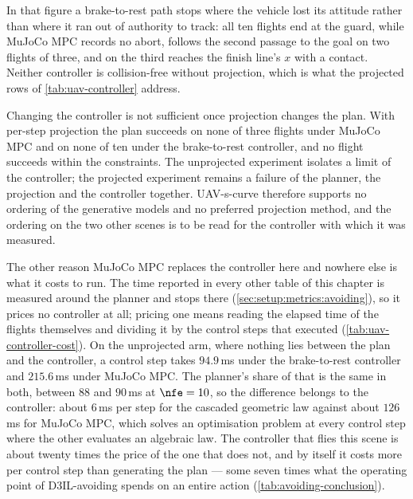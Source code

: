 In that figure a brake-to-rest path stops where the vehicle lost its attitude rather than where it ran
out of authority to track: all ten flights end at the guard, while MuJoCo MPC records no abort,
follows the second passage to the goal on two flights of three, and on the third reaches the finish
line's $x$ with a contact. Neither controller is collision-free
without projection, which is what the projected rows of \autoref{tab:uav-controller} address.

Changing the controller is not sufficient once projection changes the plan. With per-step projection the
plan succeeds on none of three flights under MuJoCo MPC and on none of ten under the brake-to-rest
controller, and no flight succeeds within the constraints. The unprojected experiment isolates a limit of
the controller; the projected experiment remains a failure of the planner, the projection and the
controller together. UAV-s-curve therefore supports no ordering of the generative models and no preferred
projection method, and the ordering on the two other scenes is to be read for the controller with which it
was measured.

The other reason MuJoCo MPC replaces the controller here and nowhere else is what it costs to run. The
time reported in every other table of this chapter is measured around the planner and stops there
(\autoref{sec:setup:metrics:avoiding}), so it prices no controller at all; pricing one means reading the
elapsed time of the flights themselves and dividing it by the control steps that executed
(\autoref{tab:uav-controller-cost}). On the unprojected arm, where nothing lies between the plan and the
controller, a control step takes $94.9$\,ms under the brake-to-rest controller and $215.6$\,ms under
MuJoCo MPC. The planner's share of that is the same in both, between $88$ and $90$\,ms at $\nfe=10$, so
the difference belongs to the controller: about $6$\,ms per step for the cascaded geometric law against
about $126$\,ms for MuJoCo MPC, which solves an optimisation problem at every control step where the
other evaluates an algebraic law. The controller that flies this scene is about twenty times the price
of the one that does not, and by itself it costs more per control step than generating the plan --- some
seven times what the operating point of D3IL-avoiding spends on an entire action
(\autoref{tab:avoiding-conclusion}).

